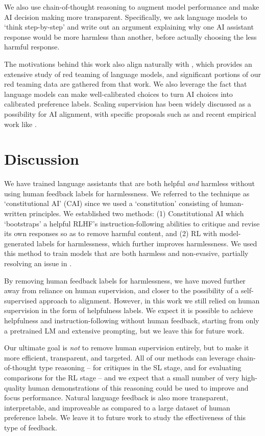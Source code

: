 \documentclass[english]{article}
\renewcommand\>{\rangle}
\begin{document}
We also use chain-of-thought reasoning \cite{ScratchPad, ChainOfThought} to augment model performance and make AI decision making more transparent.  Specifically, we ask language models to `think step-by-step' \cite{StepByStep} and write out an argument explaining why one AI assistant response would be more harmless than another, before actually choosing the less harmful response.

The motivations behind this work also align naturally with \cite{DeepRedTeaming}, which provides an extensive study of red teaming of language models, and significant portions of our red teaming data are gathered from that work. We also leverage the fact that language models can make well-calibrated choices \cite{LMsKnowWhatTheyKnow} to turn AI choices into calibrated preference labels. Scaling supervision has been widely discussed as a possibility for AI alignment, with specific proposals such as \cite{christiano2018supervising,irving2018ai} and recent empirical work like \cite{BowmanSandwiching}.


\section{Discussion}

We have trained language assistants that are both helpful {\it and} harmless without using  human feedback labels for harmlessness. We referred to the technique as `constitutional AI' (CAI) since we used a  `constitution' consisting of  human-written principles.  We established two methods: (1) Constitutional AI which `bootstraps' a helpful RLHF's instruction-following abilities to critique and revise its own responses so as to remove harmful content, and (2) RL with model-generated labels for harmlessness, which further improves harmlessness.  We used this method to train models that are both harmless and non-evasive, partially resolving an issue in \cite{bai2022training}.

By removing human feedback  labels for harmlessness, we have moved further away from reliance on human supervision, and closer to the possibility of a  self-supervised approach to alignment. However, in this work we still relied on human supervision in the form of helpfulness labels.  We expect it is possible to achieve helpfulness and instruction-following without human feedback, starting from only a pretrained LM and extensive prompting, but we leave this  for future work.

Our ultimate goal is \emph{not} to remove human supervision entirely, but to make it more efficient, transparent, and targeted.  All of our methods can leverage chain-of-thought \cite{ScratchPad, ChainOfThought} type reasoning -- for critiques in the SL stage, and for evaluating comparisons for the RL stage -- and we expect that a small number of very high-quality human demonstrations of this reasoning \cite{PerezLanguageFeedback, OAISelfCritique} could be used to improve and focus performance. Natural language  feedback is also more transparent, interpretable, and improveable as compared to a large dataset of human preference labels.  We leave  it to future work to study the effectiveness of this type of feedback.
\end{document}
